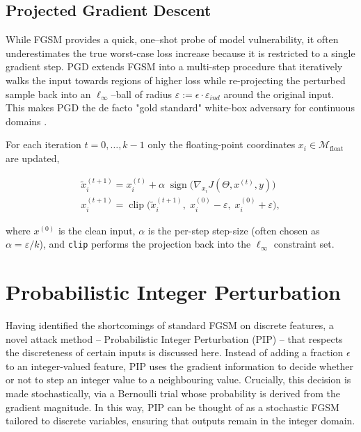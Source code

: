 \subsection{Projected Gradient Descent}

While FGSM provides a quick, one–shot probe of model vulnerability, it often underestimates the true  worst-case loss increase because it is restricted to a single gradient step. PGD extends FGSM into a multi-step procedure that iteratively walks the input towards regions of higher loss while re-projecting the perturbed sample back into an $\ell_{\infty}$–ball of radius $\varepsilon:=\epsilon\cdot\varepsilon_{ind}$ around the original input. This makes PGD the de facto "gold standard" white-box adversary for continuous domains \cite{madry2019deeplearningmodelsresistant}.

For each iteration $t\!=\!0,\dots,k{-}1$ only the floating-point coordinates
$x_i\!\in\!\mathcal{M}_{\text{float}}$ are updated,

\begin{equation}
\begin{aligned}
\tilde{x}^{(t+1)}_i = x^{(t)}_i
        + \alpha \;\operatorname{sign}\!\bigl(\nabla_{x_i} J(\Theta,x^{(t)},y)\bigr) \\
x^{(t+1)}_i  = \operatorname{clip}\!\bigl(
          \tilde{x}^{(t+1)}_i,\;
          x^{(0)}_i - \varepsilon,\;
          x^{(0)}_i + \varepsilon
        \bigr),                                         
\label{eq:pgd_update}
\end{aligned}
\end{equation}

where $x^{(0)}$ is the clean input, $\alpha$ is the per-step step-size
(often chosen as $\alpha=\varepsilon/k$), and \texttt{clip} performs the projection back into the $\ell_{\infty}$ constraint set.


\section{Probabilistic Integer Perturbation}
\label{sec:intprob_methodology}

Having identified the shortcomings of standard FGSM on discrete features, a novel attack method – Probabilistic Integer Perturbation (PIP) – that respects the discreteness of certain inputs is discussed here. Instead of adding a fraction $\epsilon$ to an integer-valued feature, PIP uses the gradient information to decide whether or not to step an integer value to a neighbouring value. Crucially, this decision is made stochastically, via a Bernoulli trial whose probability is derived from the gradient magnitude. In this way, PIP can be thought of as a stochastic FGSM tailored to discrete variables, ensuring that outputs remain in the integer domain.

